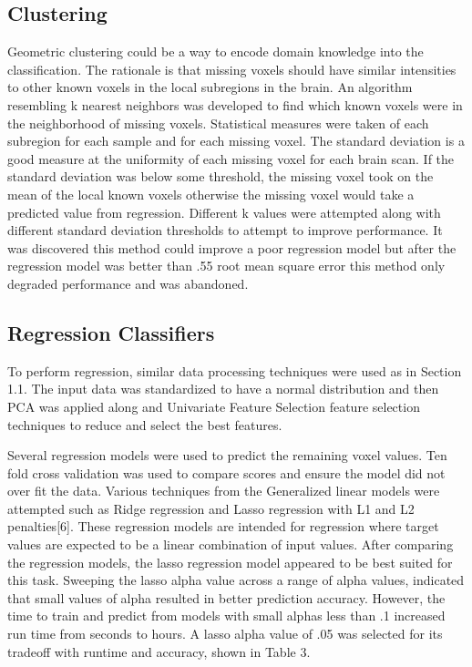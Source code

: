 \documentclass{article} %
\begin{document}
\subsection{Clustering}
Geometric clustering could be a way to encode domain knowledge into the classification. The rationale is that missing voxels should have similar intensities to other known voxels in the local subregions in the brain. An algorithm resembling k nearest neighbors was developed to find which known voxels were in the neighborhood of missing voxels. Statistical measures were taken of each subregion for each sample and for each missing voxel.  The standard deviation is a good measure at the uniformity of each missing voxel for each brain scan. If the standard deviation was below some threshold, the missing voxel took on the mean of the local known voxels otherwise the missing voxel would take a predicted value from regression. Different k values were attempted along with different standard deviation thresholds to attempt to improve performance. It was discovered this method could improve a poor regression model but after the regression model was better than .55 root mean square error this method only degraded performance and was abandoned. 

\subsection{Regression Classifiers}

To perform regression, similar data processing techniques were used as in Section 1.1. The input data was standardized to have a normal distribution and then PCA was applied along and Univariate Feature Selection feature selection techniques to reduce and select the best features. 

Several regression models were used to predict the remaining voxel values. Ten fold cross validation was used to compare scores and ensure the model did not over fit the data. Various techniques from the Generalized linear models were attempted such as Ridge regression and Lasso regression with L1 and L2 penalties[6]. These regression models are intended for regression where target values are expected to be a linear combination of input values. After comparing the regression models, the lasso regression model appeared to be best suited for this task. Sweeping the lasso alpha value across a range of alpha values, indicated that small values of alpha resulted in better prediction accuracy. However, the time to train and predict from models with small alphas less than .1 increased run time from seconds to hours. A lasso alpha value of .05 was selected for its tradeoff with runtime and accuracy, shown in Table 3.
\end{document}
